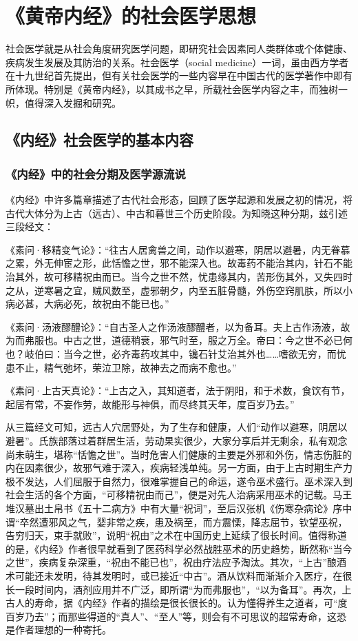 \documentclass[12pt]{ctexbook}
\begin{document}
\pagestyle{main}
\fi
\chapter{《黄帝内经》的社会医学思想}%

社会医学就是从社会角度研究医学问题，即研究社会因素同人类群体或个体健康、疾病发生发展及其防治的关系。社会医学（social medicine）一词，虽由西方学者在十九世纪首先提出，但有关社会医学的一些内容早在中国古代的医学著作中即有所体现。特别是《黄帝内经》，以其成书之早，所载社会医学内容之丰，而独树一帜，值得深入发掘和研究。

\section{《内经》社会医学的基本内容}%

\subsection{《内经》中的社会分期及医学源流说}%

《内经》中许多篇章描述了古代社会形态，回顾了医学起源和发展之初的情况，将古代大体分为上古（远古）、中古和暮世三个历史阶段。为知晓这种分期，兹引述三段经文：

《素问·移精变气论》：“往古人居禽兽之间，动作以避寒，阴居以避暑，内无眷慕之累，外无伸宦之形，此恬憺之世，邪不能深入也。故毒药不能治其内，针石不能治其外，故可移精祝由而已。当今之世不然，忧患缘其内，苦形伤其外，又失四时之从，逆寒暑之宜，贼风数至，虚邪朝夕，内至五脏骨髓，外伤空窍肌肤，所以小病必甚，大病必死，故祝由不能已也。”

《素问·汤液醪醴论》：“自古圣人之作汤液醪醴者，以为备耳。夫上古作汤液，故为而弗服也。中古之世，道德稍衰，邪气时至，服之万全。帝曰：今之世不必已何也？岐伯曰：当今之世，必齐毒药攻其中，镵石针艾治其外也……嗜欲无穷，而忧患不止，精气弛坏，荣泣卫除，故神去之而病不愈也。”

《素问·上古天真论》：“上古之入，其知道者，法于阴阳，和于术数，食饮有节，起居有常，不妄作劳，故能形与神俱，而尽终其天年，度百岁乃去。”

从三篇经文可知，远古人穴居野处，为了生存和健康，人们“动作以避寒，阴居以避暑”。氏族部落过着群居生活，劳动果实很少，大家分享后并无剩余，私有观念尚未萌生，堪称“恬憺之世”。当时危害人们健康的主要是外邪和外伤，情志伤脏的内在因素很少，故邪气难于深入，疾病轻浅单纯。另一方面，由于上古时期生产力极不发达，人们屈服于自然力，很难掌握自己的命运，遂令巫术盛行。巫术深入到社会生活的各个方面，“可移精祝由而己”，便是对先人治病采用巫术的记载。马王堆汉墓出土帛书《五十二病方》中有大量“祝词”，至后汉张机《伤寒杂病论》序中谓“卒然遭邪风之气，婴非常之疾，患及祸至，而方震慄，降志屈节，钦望巫祝，告穷归天，束手就败”，说明“祝由”之术在中国历史上延续了很长时间。值得称道的是，《内经》作者很早就看到了医药科学必然战胜巫术的历史趋势，断然称“当今之世”，疾病复杂深重，“祝由不能已也”，祝由疗法应予淘汰。其次，“上古”酿酒术可能还未发明，待其发明时，或已接近“中古”。酒从饮料而渐渐介入医疗，在很长一段时间内，酒剂应用并不广泛，即所谓“为而弗服也”，“以为备耳”。再次，上古人的寿命，据《内经》作者的描绘是很长很长的。认为懂得养生之道者，可“度百岁乃去”；而那些得道的“真人”、“至人”等，则会有不可思议的超常寿命，这恐是作者理想的一种寄托。
\end{document}
